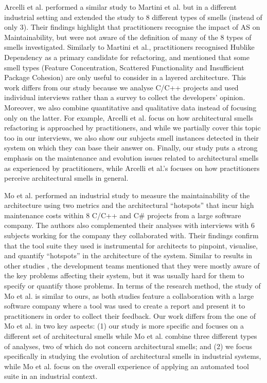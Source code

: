 Arcelli et al. \cite{Arcelli2020} performed a similar study to Martini et al. but in a different industrial setting and extended the study to 8 different types of smells (instead of only 3).
Their findings highlight that practitioners recognise the impact of AS on Maintainability, but were not aware of the definition of many of the 8 types of smells investigated.
Similarly to Martini et al., practitioners recognised Hublike Dependency as a primary candidate for refactoring, and mentioned that some smell types (Feature Concentration, Scattered Functionality and Insufficient Package Cohesion) are only useful to consider in a layered architecture.
This work differs from our study because we analyse C/C++ projects and used individual interviews rather than a survey to collect the developers' opinion. Moreover, we also combine quantitative and qualitative data instead of focusing only on the latter. 
For example, Arcelli et al. focus on how architectural smells refactoring is approached by practitioners, and while we partially cover this topic too in our interviews, we also show our subjects smell instances detected in their system on which they can base their answer on.
Finally, our study puts a strong emphasis on the maintenance and evolution issues related to architectural smells as experienced by practitioners, while Arcelli et al.'s focuses on how practitioners perceive architectural smells in general. 

Mo et al. \cite{Mo2018} performed an industrial study to measure the maintainability of the architecture using two metrics and the architectural ``hotspots'' that incur high maintenance costs within 8 C/C++ and C\# projects from a large software company.
The authors also complemented their analyses with interviews with 6 subjects working for the company they collaborated with.
Their findings confirm that the tool suite they used is instrumental for architects to pinpoint, visualise, and quantify ``hotspots'' in the architecture of the system.
Similar to results in other studies \cite{Arcelli2020}, the development teams mentioned that they were mostly aware of the key problems affecting their system, but it was usually hard for them to specify or quantify those problems.
In terms of the research method, the study of Mo et al. is similar to ours, as both studies feature a collaboration with a large software company where a tool was used to create a report and present it to practitioners in order to collect their feedback.
Our work differs from the one of Mo et al. in two key aspects: (1) our study is more specific and focuses on a different set of architectural smells while Mo et al. combine three different types of analyses, two of which do not concern architectural smells; and (2) we focus specifically in studying the evolution of architectural smells in industrial systems, while Mo et al. focus on the overall experience of applying an automated tool suite in an industrial context.

